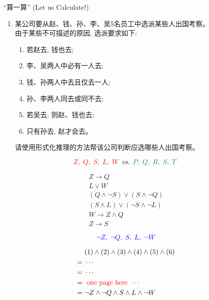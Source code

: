 \begin{frame}{}
  \begin{exampleblock}{``算一算'' (Let us Calculate!)}	
    \begin{enumerate}[(1)]
      \item 某公司要从赵、钱、孙、李、吴5名员工中选派某些人出国考察。\\
	由于某些不可描述的原因, 选派要求如下:

	\begin{enumerate}[(1)]
	  \item 若赵去, 钱也去;
	  \item 李、吴两人中必有一人去; 
	  \item 钱、孙两人中去且仅去一人; 
	  \item 孙、李两人同去或同不去; 
	  \item 若吴去, 则赵、钱也去;
	  \item 只有孙去, 赵才会去。
	\end{enumerate}

	请使用形式化推理的方法帮该公司判断应选哪些人出国考察。
    \end{enumerate}
  \end{exampleblock}

  \pause
  \vspace{0.30cm}
  \[
    \textcolor{red}{Z,\; Q,\; S,\; L,\; W} \emph{ vs. } \textcolor{teal}{P,\; Q,\; R,\; S,\; T\;}
  \]
\end{frame}

\begin{frame}{}
  \setlength{\jot}{1.5ex}
  \begin{gather}
    Z \to Q \\
    L \lor W \\
    (Q \land \lnot S) \lor (S \land \lnot Q) \\
    (S \land L) \lor (\lnot S \land \lnot L) \\
    W \to Z \land Q \\
    Z \to S
  \end{gather}

  \pause
  \vspace{0.60cm}
  \[
    \textcolor{blue}{\lnot Z,\; \lnot Q,\; S,\; L,\; \lnot W}
  \]
\end{frame}

\begin{frame}{}
  \setlength{\jot}{1.5ex}
  \begin{align*}
    & (1) \land (2) \land (3) \land (4) \land (5) \land (6) \\
    =\; & \cdots \\
    =\; & \cdots \\
    =\; & \textcolor{red}{\text{ one page here } \cdots } \\
    =\; & \lnot Z \land \lnot Q \land S \land L \land \lnot W
  \end{align*}

  \pause
\end{frame}

